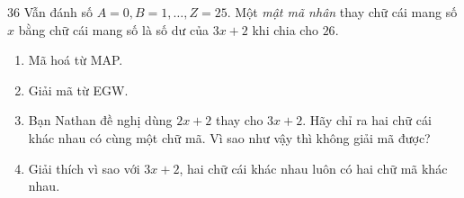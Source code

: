 \begin{probbox}{36}{}
Vẫn đánh số $A = 0, B = 1, \dots, Z = 25$. Một \emph{mật mã nhân} thay chữ cái mang số $x$ bằng chữ cái mang số là
số dư của $3x + 2$ khi chia cho $26$.
\begin{enumerate}[label=\alph*),leftmargin=1.6em,itemsep=1pt,topsep=2pt]
  \item Mã hoá từ \textsf{MAP}.
  \item Giải mã từ \textsf{EGW}.
  \item Bạn Nathan đề nghị dùng $2x + 2$ thay cho $3x + 2$. Hãy chỉ ra hai chữ cái khác nhau có cùng một chữ mã. Vì sao như vậy thì
  không giải mã được?
  \item Giải thích vì sao với $3x + 2$, hai chữ cái khác nhau luôn có hai chữ mã khác nhau.
\end{enumerate}
\end{probbox}
